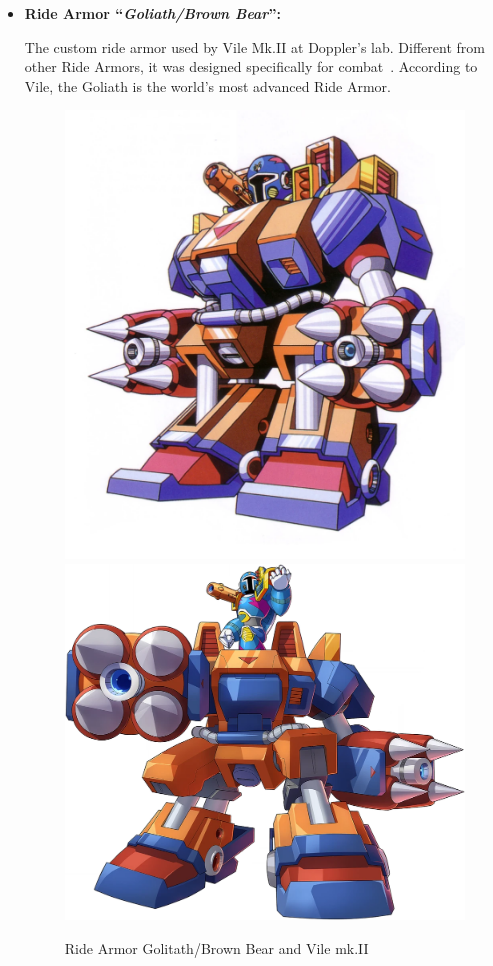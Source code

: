 \begin{itemize}
	\item \hypertarget{vehicle:Ride_Armor_Goliath}{\textbf{Ride Armor ``\textit{Goliath/Brown Bear}'':}} The custom ride armor used by Vile Mk.II at Doppler's lab. Different from 
	other Ride Armors, it was designed specifically for combat~\cite{wayback:X3_resources}. According to Vile, the Goliath is the world's most advanced Ride Armor.~\cite{book:MH_field_guide}
	\begin{figure}[htp]
		\centering
		\includegraphics[height=\portraitsize]{figures/X3/Doppler_stages/vile2_armor.png}
		\includegraphics[height=\portraitsize]{figures/X3/Doppler_stages/X_DiVE_Vile_MK2_on_Goliath.png}
		\caption{Ride Armor Golitath/Brown Bear and Vile mk.II}
	\end{figure}
	

\end{itemize}
